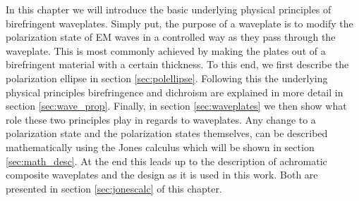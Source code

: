 \label{ch:theory}

In this chapter we will introduce the basic underlying physical principles of birefringent waveplates. Simply put, the purpose of a waveplate is to modify the polarization state of EM waves in a controlled way as they pass through the waveplate. This is most commonly achieved by making the plates out of a birefringent material with a certain thickness. To this end, we first describe the polarization ellipse in section \ref{sec:polellipse}. Following this the underlying physical principles birefringence and dichroism are explained in more detail in section \ref{sec:wave_prop}. Finally, in section \ref{sec:waveplates} we then show what role these two principles play in regards to waveplates. Any change to a polarization state and the polarization states themselves, can be described mathematically using the Jones calculus which will be shown in section \ref{sec:math_desc}. At the end this leads up to the description of achromatic composite waveplates and the design as it is used in this work. Both are presented in section \ref{sec:jonescalc} of this chapter.

